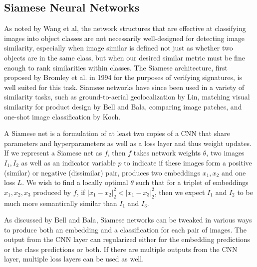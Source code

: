 \subsection{Siamese Neural Networks}

As noted by Wang et al\cite{wang2014learning}, the network structures that are effective at classifying images into object classes are not necessarily well-designed for detecting image similarity, especially when image similar is defined not just as whether two objects are in the same class, but when our desired similar metric must be fine enough to rank similarities within classes. The Siamese architecture, first proposed by Bromley et al. in 1994\cite{bromley1993signature} for the purposes of verifying signatures, is well suited for this task. Siamese networks have since been used in a variety of similarity tasks, such as ground-to-aerial geolocalization by Lin\cite{lin2015learning}, matching visual similarity for product design by Bell and Bala\cite{bell2015learning}, comparing image patches\cite{zagoruyko2015learning}, and one-shot image classification by Koch\cite{koch2015siamese}.

A Siamese net is a formulation of at least two copies of a CNN that share parameters and hyperparameters as well as a loss layer and thus weight updates. If we represent a Siamese net as $f$, then $f$ takes network weights $\theta$, two images \textbf{$I_1, I_2$} as well as an indicator variable $p$ to indicate if these images form a positive (similar) or negative (dissimilar) pair, produces two embeddings $x_1, x_2$ and one loss $L$. We wish to find a locally optimal $\theta$ such that for a triplet of embeddings $x_1, x_2, x_3$ produced by $f$, if $|x_1 - x_2|_2^2 < |x_1 - x_3|_2^2$, then we expect \textbf{$I_1$} and \textbf{$I_2$} to be much more semantically similar than \textbf{$I_1$} and \textbf{$I_3$}.

As discussed by Bell and Bala\cite{bell2015learning}, Siamese networks can be tweaked in various ways to produce both an embedding and a classification for each pair of images. The output from the CNN layer can regularized either for the embedding predictions or the class predictions or both. If there are multiple outputs from the CNN layer, multiple loss layers can be used as well.

